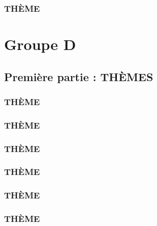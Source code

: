 \documentclass[poly,trombi]{valbonne}
\begin{document}

\subsection{THÈME}


\chapter{Groupe D}

\minitoc \clearpage

\section{Première partie : THÈMES}

\subsection{THÈME}


\subsection{THÈME}


\subsection{THÈME}


\subsection{THÈME}


\subsection{THÈME}


\subsection{THÈME}

\end{document}
